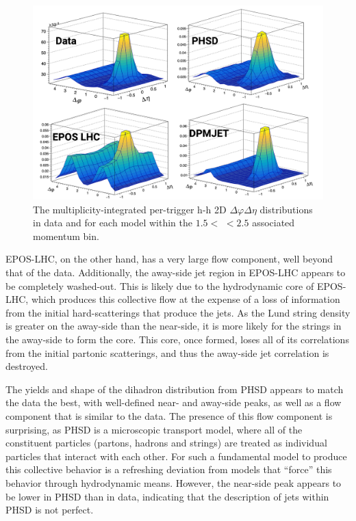 \begin{figure}[ht]
\centering
\includegraphics[width=\textwidth]{figures/results/h_h_2d_modelcomp.png}
\caption{The multiplicity-integrated per-trigger h-h 2D $\Delta\varphi\Delta\eta$ distributions in data and for each model within the $1.5 <$ \pt $< 2.5$ \GeVc associated momentum bin.}
\label{fig:h_h_2d_model}
\end{figure}

EPOS-LHC, on the other hand, has a very large flow component, well beyond that of the data. Additionally, the away-side jet region in EPOS-LHC appears to be completely washed-out. This is likely due to the hydrodynamic core of EPOS-LHC, which produces this collective flow at the expense of a loss of information from the initial hard-scatterings that produce the jets. As the Lund string density is greater on the away-side than the near-side, it is more likely for the strings in the away-side to form the core. This core, once formed, loses all of its correlations from the initial partonic scatterings, and thus the away-side jet correlation is destroyed. 

The yields and shape of the dihadron distribution from PHSD appears to match the data the best, with well-defined near- and away-side peaks, as well as a flow component that is similar to the data. The presence of this flow component is surprising, as PHSD is a microscopic transport model, where all of the constituent particles (partons, hadrons and strings) are treated as individual particles that interact with each other. For such a fundamental model to produce this collective behavior is a refreshing deviation from models that ``force'' this behavior through hydrodynamic means. However, the near-side peak appears to be lower in PHSD than in data, indicating that the description of jets within PHSD is not perfect.

